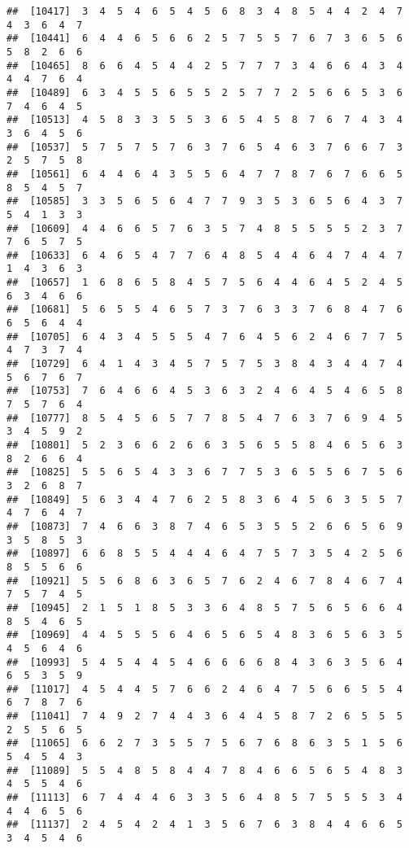 \documentclass[
]{book}
\begin{document}
\begin{verbatim}
##  [10417]  3  4  5  4  6  5  4  5  6  8  3  4  8  5  4  4  2  4  7  4  3  6  4  7
##  [10441]  6  4  4  6  5  6  6  2  5  7  5  5  7  6  7  3  6  5  6  5  8  2  6  6
##  [10465]  8  6  6  4  5  4  4  2  5  7  7  7  3  4  6  6  4  3  4  4  4  7  6  4
##  [10489]  6  3  4  5  5  6  5  5  2  5  7  7  2  5  6  6  5  3  6  7  4  6  4  5
##  [10513]  4  5  8  3  3  5  5  3  6  5  4  5  8  7  6  7  4  3  4  3  6  4  5  6
##  [10537]  5  7  5  7  5  7  6  3  7  6  5  4  6  3  7  6  6  7  3  2  5  7  5  8
##  [10561]  6  4  4  6  4  3  5  5  6  4  7  7  8  7  6  7  6  6  5  8  5  4  5  7
##  [10585]  3  3  5  6  5  6  4  7  7  9  3  5  3  6  5  6  4  3  7  5  4  1  3  3
##  [10609]  4  4  6  6  5  7  6  3  5  7  4  8  5  5  5  5  2  3  7  7  6  5  7  5
##  [10633]  6  4  6  5  4  7  7  6  4  8  5  4  4  6  4  7  4  4  7  1  4  3  6  3
##  [10657]  1  6  8  6  5  8  4  5  7  5  6  4  4  6  4  5  2  4  5  6  3  4  6  6
##  [10681]  5  6  5  5  4  6  5  7  3  7  6  3  3  7  6  8  4  7  6  6  5  6  4  4
##  [10705]  6  4  3  4  5  5  5  4  7  6  4  5  6  2  4  6  7  7  5  4  7  3  7  4
##  [10729]  6  4  1  4  3  4  5  7  5  7  5  3  8  4  3  4  4  7  4  5  6  7  6  7
##  [10753]  7  6  4  6  6  4  5  3  6  3  2  4  6  4  5  4  6  5  8  7  5  7  6  4
##  [10777]  8  5  4  5  6  5  7  7  8  5  4  7  6  3  7  6  9  4  5  3  4  5  9  2
##  [10801]  5  2  3  6  6  2  6  6  3  5  6  5  5  8  4  6  5  6  3  8  2  6  6  4
##  [10825]  5  5  6  5  4  3  3  6  7  7  5  3  6  5  5  6  7  5  6  3  2  6  8  7
##  [10849]  5  6  3  4  4  7  6  2  5  8  3  6  4  5  6  3  5  5  7  4  7  6  4  7
##  [10873]  7  4  6  6  3  8  7  4  6  5  3  5  5  2  6  6  5  6  9  3  5  8  5  3
##  [10897]  6  6  8  5  5  4  4  4  6  4  7  5  7  3  5  4  2  5  6  8  5  5  6  6
##  [10921]  5  5  6  8  6  3  6  5  7  6  2  4  6  7  8  4  6  7  4  7  5  7  4  5
##  [10945]  2  1  5  1  8  5  3  3  6  4  8  5  7  5  6  5  6  6  4  8  5  4  6  5
##  [10969]  4  4  5  5  5  6  4  6  5  6  5  4  8  3  6  5  6  3  5  4  5  6  4  6
##  [10993]  5  4  5  4  4  5  4  6  6  6  6  8  4  3  6  3  5  6  4  6  5  3  5  9
##  [11017]  4  5  4  4  5  7  6  6  2  4  6  4  7  5  6  6  5  5  4  6  7  8  7  6
##  [11041]  7  4  9  2  7  4  4  3  6  4  4  5  8  7  2  6  5  5  5  2  5  5  6  5
##  [11065]  6  6  2  7  3  5  5  7  5  6  7  6  8  6  3  5  1  5  6  5  4  5  4  3
##  [11089]  5  5  4  8  5  8  4  4  7  8  4  6  6  5  6  5  4  8  3  4  5  5  4  6
##  [11113]  6  7  4  4  4  6  3  3  5  6  4  8  5  7  5  5  5  3  4  4  4  6  5  6
##  [11137]  2  4  5  4  2  4  1  3  5  6  7  6  3  8  4  4  6  6  5  3  4  5  4  6

\end{verbatim}
\end{document}

